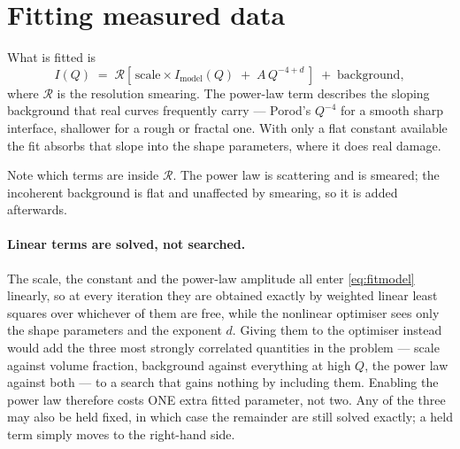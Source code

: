 \documentclass[11pt,a4paper]{article}
\begin{document}
\section{Fitting measured data}

What is fitted is
\begin{equation}
  I(Q) \;=\; \mathcal{R}\!\left[\,\mathrm{scale}\times I_{\mathrm{model}}(Q)
  \;+\; A\,Q^{-4+d}\,\right] \;+\; \mathrm{background},
  \label{eq:fitmodel}
\end{equation}
where $\mathcal{R}$ is the resolution smearing. The power-law term describes
the sloping background that real curves frequently carry --- Porod's $Q^{-4}$
for a smooth sharp interface, shallower for a rough or fractal one. With only
a flat constant available the fit absorbs that slope into the shape
parameters, where it does real damage.

Note which terms are inside $\mathcal{R}$. The power law is scattering and is
smeared; the incoherent background is flat and unaffected by smearing, so it
is added afterwards.

\paragraph{Linear terms are solved, not searched.} The scale, the constant
and the power-law amplitude all enter \eqref{eq:fitmodel} linearly, so at
every iteration they are obtained exactly by weighted linear least squares
over whichever of them are free, while the nonlinear optimiser sees only the
shape parameters and the exponent $d$. Giving them to the optimiser instead
would add the three most strongly correlated quantities in the problem ---
scale against volume fraction, background against everything at high $Q$, the
power law against both --- to a search that gains nothing by including them.
Enabling the power law therefore costs ONE extra fitted parameter, not two.
Any of the three may also be held fixed, in which case the remainder are
still solved exactly; a held term simply moves to the right-hand side.
\end{document}
